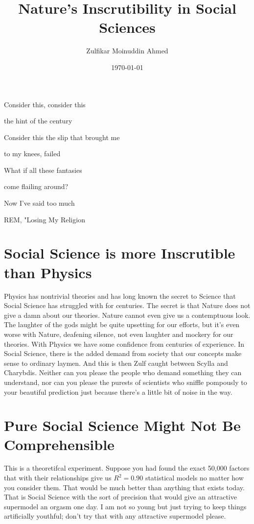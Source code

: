 \documentclass{amsart}
\title{Nature's Inscrutibility in Social Sciences}
\author{Zulfikar Moinuddin Ahmed}
\date{\today}
\begin{document}
\maketitle
\epigraph{Consider this, consider this

the hint of the century

Consider this the slip that brought me 

to my knees, failed

What if all these fantasies 

come flailing around?

Now I've said too much}{REM, "Losing My Religion}

\section{Social Science is more Inscrutible than Physics}

Physics has nontrivial theories and has long known the secret to Science that Social Science has struggled with for centuries.  The secret is that Nature does not give a damn about our theories.  Nature cannot even give us a contemptuous look.  The laughter of the gods might be quite upsetting for our efforts, but it's even worse with Nature, deafening silence, not even laughter and mockery for our theories.  With Physics we have some confidence from centuries of experience.  In Social Science, there is the added demand from society that our concepts make sense to ordinary laymen.  And this is then Zulf caught between Scylla and Charybdis.  Neither can you please the people who demand something they can understand, nor can you please the purests of scientists who sniffle pompously to your beautiful prediction just because there's a little bit of noise in the way.  

\section{Pure Social Science Might Not Be Comprehensible}

This is a theoretifcal experiment.  Suppose you had found the exact 50,000 factors that with their relationships give us $R^2=0.90$ statistical models no matter how you consider them.  That would be much better than anything that exists today.  That is Social Science with the sort of precision that would give an attractive supermodel an orgasm one day.  I am not so young but just trying to keep things artificially youthful; don't try that with any attractive supermodel please.  
\end{document}
